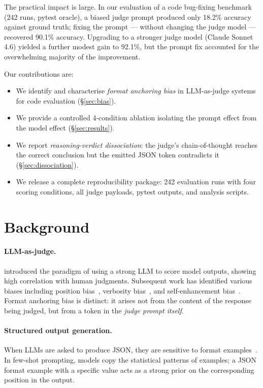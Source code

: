\documentclass[11pt]{article}
\begin{document}
The practical impact is large.
In our evaluation of a code bug-fixing benchmark (242 runs, pytest oracle),
a biased judge prompt produced only 18.2\% accuracy against ground truth;
fixing the prompt --- without changing the judge model --- recovered 90.1\%
accuracy.
Upgrading to a stronger judge model (Claude Sonnet 4.6) yielded a further
modest gain to 92.1\%, but the prompt fix accounted for the overwhelming
majority of the improvement.

Our contributions are:
\begin{itemize}
  \item We identify and characterise \emph{format anchoring bias} in
        LLM-as-judge systems for code evaluation (\S\ref{sec:bias}).
  \item We provide a controlled 4-condition ablation isolating the
        prompt effect from the model effect (\S\ref{sec:results}).
  \item We report \emph{reasoning-verdict dissociation}: the judge's
        chain-of-thought reaches the correct conclusion but the emitted
        JSON token contradicts it (\S\ref{sec:dissociation}).
  \item We release a complete reproducibility package: 242 evaluation runs
        with four scoring conditions, all judge payloads, pytest outputs,
        and analysis scripts.
\end{itemize}

\section{Background}

\paragraph{LLM-as-judge.}
\citet{zheng2023judging} introduced the paradigm of using a strong LLM
to score model outputs, showing high correlation with human judgments.
Subsequent work has identified various biases including position
bias~\citep{wang2023large}, verbosity bias~\citep{saito2023verbosity},
and self-enhancement bias~\citep{panickssery2024llm}.
Format anchoring bias is distinct: it arises not from the content of the
response being judged, but from a token in the \emph{judge prompt itself}.

\paragraph{Structured output generation.}
When LLMs are asked to produce JSON, they are sensitive to format
examples~\citep{brown2020language}.
In few-shot prompting, models copy the statistical patterns of examples;
a JSON format example with a specific value acts as a strong prior on
the corresponding position in the output.
\end{document}

